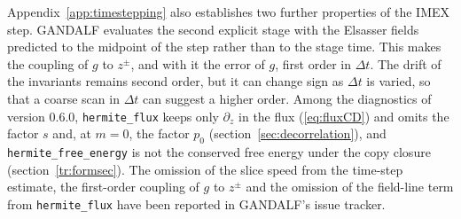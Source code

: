 Appendix~\ref{app:timestepping} also establishes two further properties of the IMEX step. GANDALF evaluates the second explicit stage with the Elsasser fields predicted to the midpoint of the step rather than to the stage time. This makes the coupling of $g$ to $z^\pm$, and with it the error of $g$, first order in $\Delta t$. The drift of the invariants remains second order, but it can change sign as $\Delta t$ is varied, so that a coarse scan in $\Delta t$ can suggest a higher order. Among the diagnostics of version 0.6.0, \texttt{hermite\_flux} keeps only $\partial_z$ in the flux (\ref{eq:fluxCD}) and omits the factor $s$ and, at $m=0$, the factor $p_0$ (section~\ref{sec:decorrelation}), and \texttt{hermite\_free\_energy} is not the conserved free energy under the copy closure (section~\ref{tr:formsec}). The omission of the slice speed from the time-step estimate, the first-order coupling of $g$ to $z^\pm$ and the omission of the field-line term from \texttt{hermite\_flux} have been reported in GANDALF's issue tracker.
